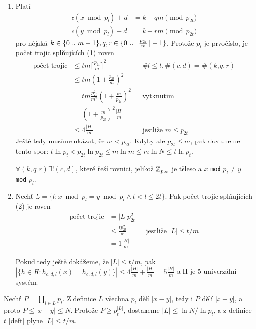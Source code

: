 \begin{enumerate}
\item
Platí
\begin{align*}
c (x \bmod p_l) + d & = k + qm  \pmod {p_{2t}}\\
c (y \bmod p_l) + d & = k + rm  \pmod {p_{2t}}
\end{align*}
pro nějaká
\( 
k \in \{{0}\ ..\ {m-1}\},
q,r \in \{{0}\ ..\ {\lceil \frac{p_{2t}}{m}\rceil - 1}\}
\).
Protože $p_l$ je prvočíslo, je počet trojic splňujících (1) roven
\begin{align*}
\text{počet trojic} & \leq t m {\lceil \frac{p_{2t}}{m}\rceil}^2
	&& \#l \leq t, \# (c,d) = \# (k,q,r)  \\
& \leq t m {\left( 1 + \frac{p_{2t}}{m}\right)}^2\\
& = t m \frac{p_{2t}^2}{m^2} {\left( 1 + \frac m{p_{2t}} \right)}^2
	&& \text{vytknutím}\\
& = {\left( 1 + \frac m{p_{2t}} \right)}^2 \frac{|H|}m \\
& \leq 4 \frac{|H|}m
	&& \text{jestliže $m\leq p_{2t}$}
\end{align*}
Ještě tedy musíme ukázat, že $m < p_{2t}$.
Kdyby ale $p_{2t} \leq m$, pak dostaneme tento spor:
$t \ln p_t < p_{2t} \ln p_{2t} \leq m \ln m \leq m \ln N 
\leq t \ln p_t$.

\begin{pozn}
$\forall (k,q,r) \exists! (c,d)$, které řeší rovnici, jelikož 
$\Bbb Z_{p_{2t}}$ je těleso a $x$ {\tt mod} $p_l \neq y$ {\tt mod} $p_l$.
\end{pozn}

\item
Nechť $L = \{ l : x \bmod p_l = y \bmod p_l \land t < l \leq 2t \}$. 
Pak počet trojic splňujících (2) je roven  
\begin{align*}
\text{počet trojic} & = |L| p_{2t}^2\\
& \leq \frac{t p_{2t}^2}m
	&& \text{jestliže $|L| \leq t/m$}\\
& = 1 \frac{|H|}m
\end{align*}

Pokud tedy ještě dokážeme, že $|L| \leq t/m$, pak 
\( 
|\{ h\in H : h_{c,d,l}(x) = h_{c,d,l}(y) \}|  
\leq 4 \frac{|H|}m + \frac{|H|}m = 5 \frac{|H|}m
\)
a H je 5-univerzální systém.
\end{enumerate}

Nechť $P = \prod_{l \in L} p_l$. 
Z definice $L$ všechna $p_l$ dělí $|x-y|$, 
tedy i $P$ dělí $|x-y|$, a proto $P \leq |x-y| \leq N$. Protože
$P \geq p_t^{|L|}$, dostaneme $|L| \leq \ln N / \ln p_t$, a z definice
$t$ \eqref{deft} plyne $|L| \leq t/m$.

